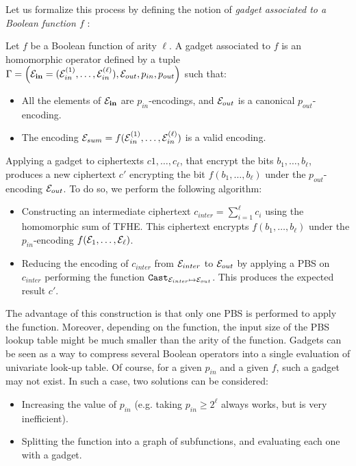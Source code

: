 Let us formalize this process by defining the notion of \textit{gadget associated to a Boolean function $f$} :
\begin{definition}[Gadget]
    Let $f$ be a Boolean function of arity $\ell$.
    A gadget associated to $f$ is an homomorphic operator defined by a tuple $\Gamma = \left ( \mathbf{\mathcal{E}_{in}} = (\mathcal{E}_{in}^{(1)}, \dots, \mathcal{E}_{in}^{(\ell)}), \mathcal{E}_{out}, p_{in}, p_{out} \right )$ such that:
    \begin{itemize}
        \item All the elements of $\mathbf{\mathcal{E}_{in}}$ are $p_{in}$-encodings, and $\mathcal{E}_{out}$ is a canonical $p_{out}$-encoding.
        \item The encoding $\mathcal{E}_{sum} = f(\mathcal{E}_{in}^{(1)}, \dots, \mathcal{E}_{in}^{(\ell)})$ is a valid encoding.
    \end{itemize}
Applying a gadget to ciphertexts  $c1, \dots, c_\ell$, that encrypt the bits $b_1, \dots, b_\ell$, produces a new ciphertext $c'$ encrypting the bit $f(b_1, \dots, b_\ell)$ under the $p_{out}$-encoding $\mathcal{E}_{out}$. To do so, we perform the following algorithm:
\begin{itemize}
    \item Constructing an intermediate ciphertext $c_{inter} = \sum_{i=1}^{\ell} c_i$ using the homomorphic sum of TFHE. This ciphertext encrypts $f(b_1, \dots, b_\ell)$ under the $p_{in}$-encoding $f(\mathcal{E}_1, \dots, \mathcal{E}_\ell)$.
    \item Reducing the encoding of $c_{inter}$ from $\mathcal{E}_{inter}$ to $\mathcal{E}_{out}$ by applying a PBS on $c_{inter}$ performing the function $\texttt{Cast}_{\mathcal{E}_{inter} \mapsto \mathcal{E}_{out}}$. This produces the expected result $c'$.
    \end{itemize}
\label{def:gadget}
\end{definition}


The advantage of this construction is that only one PBS is performed to apply the function. Moreover, depending on the function, the input size of the PBS lookup table might be much smaller than the arity of the function. Gadgets can be seen as a way to compress several Boolean operators into a single evaluation of univariate look-up table.
Of course, for a given $p_{in}$ and a given $f$, such a gadget may not exist. In such a case, two solutions can be considered:
\begin{itemize}
    \item Increasing the value of $p_{in}$ (e.g.  taking $p_{in} \ge 2^\ell$ always works, but is very inefficient).
    \item Splitting the function into a graph of subfunctions, and evaluating each one with a gadget.
\end{itemize}


